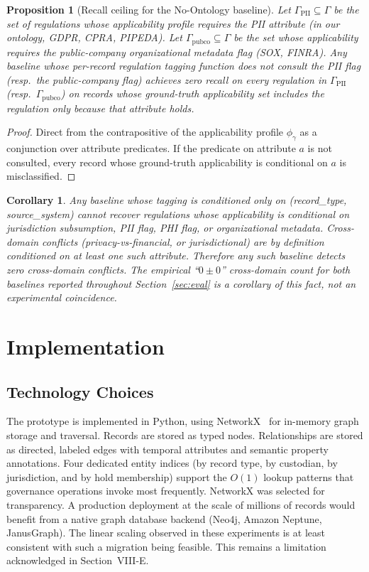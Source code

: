 \documentclass{ieeeaccess}
\newtheorem{proposition}{Proposition}
\newtheorem{corollary}{Corollary}
\begin{document}
\begin{proposition}[Recall ceiling for the No-Ontology baseline]
Let $\Gamma_{\mathrm{PII}} \subseteq \Gamma$ be the set of regulations whose applicability profile requires the PII attribute (in our ontology, GDPR, CPRA, PIPEDA). Let $\Gamma_{\mathrm{pubco}} \subseteq \Gamma$ be the set whose applicability requires the public-company organizational metadata flag (SOX, FINRA). Any baseline whose per-record regulation tagging function does not consult the PII flag (resp.\ the public-company flag) achieves zero recall on every regulation in $\Gamma_{\mathrm{PII}}$ (resp.\ $\Gamma_{\mathrm{pubco}}$) on records whose ground-truth applicability set includes the regulation only because that attribute holds.
\end{proposition}

\begin{proof}
Direct from the contrapositive of the applicability profile $\phi_\gamma$ as a conjunction over attribute predicates. If the predicate on attribute $a$ is not consulted, every record whose ground-truth applicability is conditional on $a$ is misclassified.
\end{proof}

\begin{corollary}
Any baseline whose tagging is conditioned only on (record\_type, source\_system) cannot recover regulations whose applicability is conditional on jurisdiction subsumption, PII flag, PHI flag, or organizational metadata. Cross-domain conflicts (privacy-vs-financial, or jurisdictional) are by definition conditioned on at least one such attribute. Therefore any such baseline detects zero cross-domain conflicts. The empirical ``$0 \pm 0$'' cross-domain count for both baselines reported throughout Section~\ref{sec:eval} is a corollary of this fact, not an experimental coincidence.
\end{corollary}

\section{Implementation}

\subsection{Technology Choices}

The prototype is implemented in Python, using NetworkX~\cite{networkx} for in-memory graph storage and traversal. Records are stored as typed nodes. Relationships are stored as directed, labeled edges with temporal attributes and semantic property annotations. Four dedicated entity indices (by record type, by custodian, by jurisdiction, and by hold membership) support the $O(1)$ lookup patterns that governance operations invoke most frequently. NetworkX was selected for transparency. A production deployment at the scale of millions of records would benefit from a native graph database backend (Neo4j, Amazon Neptune, JanusGraph). The linear scaling observed in these experiments is at least consistent with such a migration being feasible. This remains a limitation acknowledged in Section~VIII-E.
\end{document}
